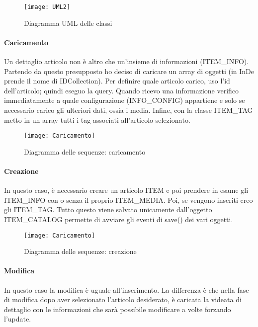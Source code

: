 \begin{figure}[!h] 
	\centering 
	\texttt{[image: UML2]} 
	\caption{Diagramma UML delle classi}
	\label{UML}
\end{figure}

\paragraph{Caricamento}
Un dettaglio articolo non è altro che un'insieme di informazioni (ITEM\_INFO). Partendo da questo presupposto ho deciso di caricare un array di oggetti (in InDe prende il nome di IDCollection).
Per definire quale articolo carico, uso l'id dell'articolo; quindi eseguo la query. Quando ricevo una informazione verifico immediatamente a quale configurazione (INFO\_CONFIG) appartiene e solo se necessario carico gli ulteriori dati, ossia i media. Infine, con la classe ITEM\_TAG metto in un array tutti i tag associati all'articolo selezionato.

\begin{figure}[!h] 
	\centering 
	\texttt{[image: Caricamento]} 
	\caption{Diagramma delle sequenze: caricamento}
	\label{DS:caricamento}
\end{figure}

\paragraph{Creazione}
In questo caso, è necessario creare un articolo ITEM e poi prendere in esame gli ITEM\_INFO con o senza il proprio ITEM\_MEDIA. Poi, se vengono inseriti creo gli ITEM\_TAG. Tutto questo viene salvato unicamente dall'oggetto ITEM\_CATALOG permette di avviare gli eventi di save() dei vari oggetti.

\begin{figure}[!h] 
	\centering 
	\texttt{[image: Caricamento]} 
	\caption{Diagramma delle sequenze: creazione}
	\label{DS:creazione}
\end{figure}

\paragraph{Modifica}
In questo caso la modifica è uguale all'inserimento. La differenza è che nella fase di modifica dopo aver selezionato l'articolo desiderato, è caricata la videata di dettaglio con le informazioni che sarà possibile modificare a volte forzando l'update.

